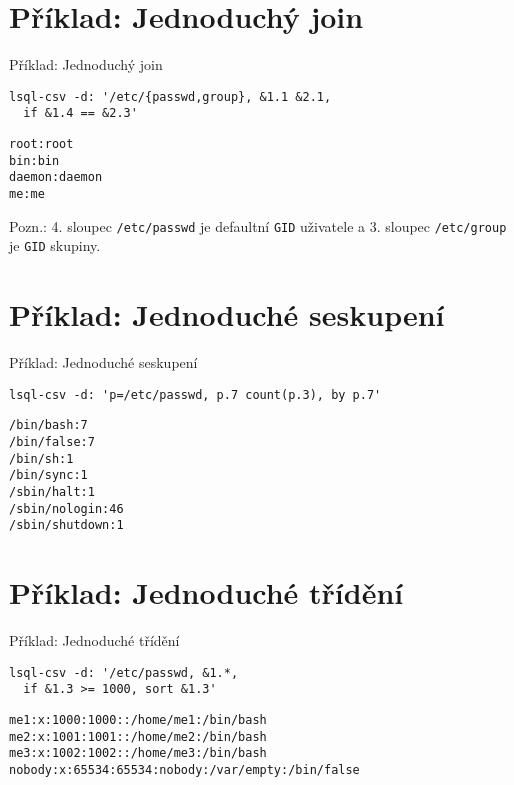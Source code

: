 \documentclass{beamer}
\def\icode#1{\texttt{#1}}
\begin{document}
\section{Příklad: Jednoduchý join}
\begin{frame}[fragile]{Příklad: Jednoduchý join}
\begin{verbatim}
lsql-csv -d: '/etc/{passwd,group}, &1.1 &2.1, 
  if &1.4 == &2.3'
\end{verbatim}

\begin{verbatim}
root:root
bin:bin
daemon:daemon
me:me
\end{verbatim}

\vskip 1cm

Pozn.: 4. sloupec \icode{/etc/passwd} je defaultní \icode{GID} uživatele a 3. sloupec \icode{/etc/group} je \icode{GID} skupiny.

\end{frame}


\section{Příklad: Jednoduché seskupení}
\begin{frame}[fragile]{Příklad: Jednoduché seskupení}
\begin{verbatim}
lsql-csv -d: 'p=/etc/passwd, p.7 count(p.3), by p.7'
\end{verbatim}

\begin{verbatim}
/bin/bash:7
/bin/false:7
/bin/sh:1
/bin/sync:1
/sbin/halt:1
/sbin/nologin:46
/sbin/shutdown:1
\end{verbatim}
\end{frame}


\section{Příklad: Jednoduché třídění}
\begin{frame}[fragile]{Příklad: Jednoduché třídění}
\begin{verbatim}
lsql-csv -d: '/etc/passwd, &1.*, 
  if &1.3 >= 1000, sort &1.3'
\end{verbatim}

\begin{verbatim}
me1:x:1000:1000::/home/me1:/bin/bash
me2:x:1001:1001::/home/me2:/bin/bash
me3:x:1002:1002::/home/me3:/bin/bash
nobody:x:65534:65534:nobody:/var/empty:/bin/false
\end{verbatim}
\end{frame}
\end{document}
